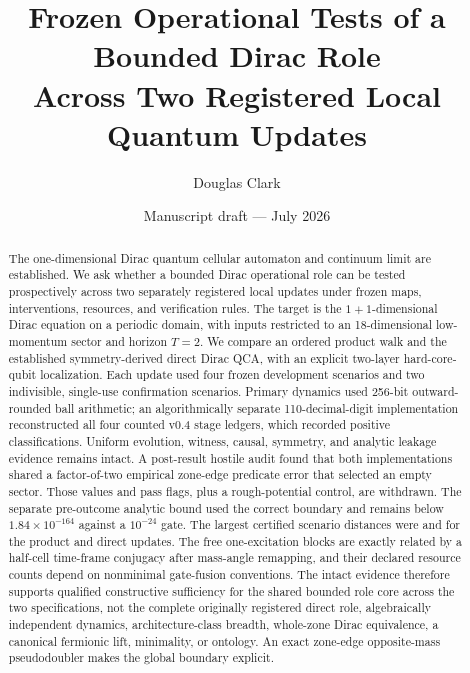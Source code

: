 \documentclass[10pt]{article}
\title{\textbf{Frozen Operational Tests of a Bounded Dirac Role\\
Across Two Registered Local Quantum Updates}}
\author{Douglas Clark}
\date{Manuscript draft --- July 2026}
\begin{document}
\maketitle

\begin{abstract}
The one-dimensional Dirac quantum cellular automaton and continuum limit are
established.  We ask whether a bounded Dirac operational role can be tested
prospectively across two separately registered local updates under frozen
maps, interventions, resources, and verification rules.  The target is the
$1+1$-dimensional Dirac equation on a periodic domain, with
inputs restricted to an 18-dimensional low-momentum sector and horizon $T=2$.
We compare an ordered product walk and the established symmetry-derived direct
Dirac QCA, with an explicit two-layer hard-core-qubit localization.  Each
update used four frozen development scenarios and two indivisible, single-use
confirmation scenarios.  Primary dynamics used
256-bit outward-rounded ball arithmetic; an algorithmically separate
110-decimal-digit implementation reconstructed all four counted v0.4 stage
ledgers, which recorded positive classifications.  Uniform evolution, witness,
causal, symmetry, and analytic leakage evidence remains intact.  A post-result
hostile audit found that both implementations shared a factor-of-two empirical
zone-edge predicate error that selected an empty sector.  Those values and
pass flags, plus a rough-potential control, are
withdrawn.  The separate pre-outcome analytic bound used the correct boundary
and remains below $1.84\times10^{-164}$ against a $10^{-24}$ gate.  The largest
certified scenario distances were \ProductOperatorMax{} and
\DirectOperatorMax{} for the product and direct updates.  The free
one-excitation blocks are exactly related by a half-cell time-frame conjugacy
after mass-angle remapping, and their declared resource counts depend on
nonminimal gate-fusion conventions.  The intact evidence therefore supports
qualified constructive sufficiency for the shared bounded role core across
the two specifications, not the complete originally registered direct
role, algebraically independent dynamics, architecture-class breadth,
whole-zone Dirac equivalence, a canonical fermionic lift, minimality, or
ontology.  An exact zone-edge opposite-mass pseudodoubler makes the global
boundary explicit.
\end{abstract}














\end{document}
